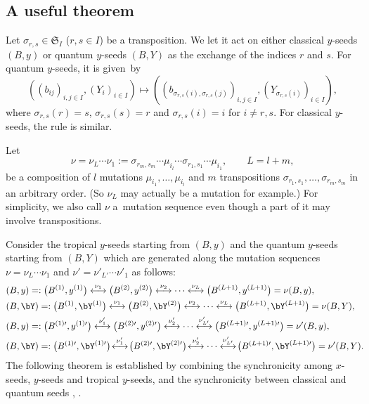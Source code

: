 \subsection{A useful theorem}

Let $\sigma_{r,s} \in \mathfrak{S}_I$ ($r, s \in I$) be a transposition.
We let it act on either classical $y$-seeds $(B,y)$ or quantum $y$-seeds $(B,Y)$
as the exchange of the indices $r$ and $s$. For quantum $y$-seeds, it
is given~by
\begin{equation}\label{qys}
((b_{ij})_{i,j\in I} , (Y_i)_{i \in I} ) \mapsto
((b_{\sigma_{r,s}(i), \sigma_{r,s}(j)})_{i,j\in I}, (Y_{\sigma_{r,s}(i)})_{i \in I} ),
\end{equation}
where $\sigma_{r,s}(r) = s$, $\sigma_{r,s}(s)=r$ and
$\sigma_{r,s}(i) = i$ for $i \neq r,s$. For classical $y$-seeds, the
rule is similar.

Let
\begin{equation}\label{nuL}
\nu = \nu_L\dotsm \nu_1 := \sigma_{r_m,s_m} \dotsm
\mu_{i_l} \dotsm \sigma_{r_1,s_1} \dotsm \mu_{i_1}, \qquad L = l+m,
\end{equation}
be a composition of $l$ mutations $\mu_{i_1}, \dots, \mu_{i_l}$ and
$m$ transpositions $\sigma_{r_1,s_1}, \dots, \sigma_{r_m, s_m}$ in
an arbitrary order. (So $\nu_L$ may actually be a mutation for
example.) For simplicity, we also call $\nu$ a~mutation sequence even
though a part of it may involve transpositions.

Consider the tropical $y$-seeds starting from $(B,y)$ and the quantum
$y$-seeds starting from $(B,Y)$ which are generated along the mutation
sequences $\nu=\nu_L\dotsm \nu_1$ and $\nu'= \nu'_{L'} \dotsm \nu'_1$
as follows:
\begin{align}%
\label{seq0}
&(B,y) =:\bigl(B^{(1)},y^{(1)}\bigr) \stackrel{\nu_1}{\longleftrightarrow}
\bigl(B^{(2)},y^{(2)}\bigr) \stackrel{\nu_2}{\longleftrightarrow}
\dotsb
\stackrel{\nu_L}{\longleftrightarrow} \bigl(B^{(L+1)},y^{(L+1)}\bigr) = \nu(B,y),
\\
&(B,\bY) =:\bigl(B^{(1)},\bY^{(1)}\bigr) \stackrel{\nu_1}{\longleftrightarrow}
\bigl(B^{(2)},\bY^{(2)}\bigr) \stackrel{\nu_2}{\longleftrightarrow}
\dotsb
\stackrel{\nu_L}{\longleftrightarrow} \bigl(B^{(L+1)},\bY^{(L+1)}\bigr) = \nu(B,Y),
\\
&(B,y) =:\bigl(B^{(1)\prime },y^{(1)\prime}\bigr) \stackrel{\nu'_1}{\longleftrightarrow}
\bigl(B^{(2)\prime},y^{(2)\prime}\bigr) \stackrel{\nu'_2}{\longleftrightarrow}
\dotsb
\stackrel{\nu'_{L'}}{\longleftrightarrow} \bigl(B^{(L+1)\prime},y^{(L+1)\prime}\bigr) = \nu'(B,y),
\\
&(B,\bY) =:\bigl(B^{(1)\prime},\bY^{(1)\prime}\bigr) \!\stackrel{\nu'_1}{\longleftrightarrow}\!
\bigl(B^{(2)\prime},\bY^{(2)\prime}\bigr) \!\stackrel{\nu'_2}{\longleftrightarrow}
\dotsb
\stackrel{\nu'_{L'}}{\longleftrightarrow} \!\bigl(B^{(L+1)\prime},\bY^{(L+1)\prime}\bigr) = \nu'(B,Y).\!\!\!
\label{seq3}
\end{align}
The following theorem is established by combining the synchronicity \cite{N21}
among $x$-seeds, $y$-seeds and tropical $y$-seeds,
and the synchronicity between classical and quantum seeds
\cite[Lemma 2.22]{FG09b}, \cite[Proposition~3.4]{KN11}.

